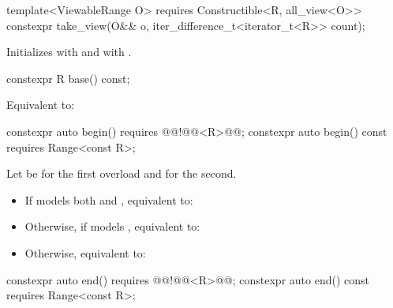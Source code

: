 \begin{addedblock}
%
\begin{itemdecl}
template<ViewableRange O>
  requires Constructible<R, all_view<O>>
constexpr take_view(O&& o, iter_difference_t<iterator_t<R>> count);
\end{itemdecl}

\begin{itemdescr}
\pnum
\effects Initializes  with 
and  with .
\end{itemdescr}

%
\begin{itemdecl}
constexpr R base() const;
\end{itemdecl}

\begin{itemdescr}
\pnum
\effects Equivalent to: 
\end{itemdescr}

%
\begin{itemdecl}
constexpr auto begin() requires @\newtxt{(}@!@@<R>@\newtxt{)}@;
constexpr auto begin() const requires Range<const R>;
\end{itemdecl}

\begin{itemdescr}
\pnum
Let  be  for the first overload and  for the
second.

\pnum
\effects
\begin{itemize}
\item If  models both  and
  , equivalent to:
\item Otherwise, if  models , equivalent to:
\item Otherwise, equivalent to:
\end{itemize}
\end{itemdescr}

%
\begin{itemdecl}
constexpr auto end() requires @\newtxt{(}@!@@<R>@\newtxt{)}@;
constexpr auto end() const requires Range<const R>;
\end{itemdecl}


\end{addedblock}
